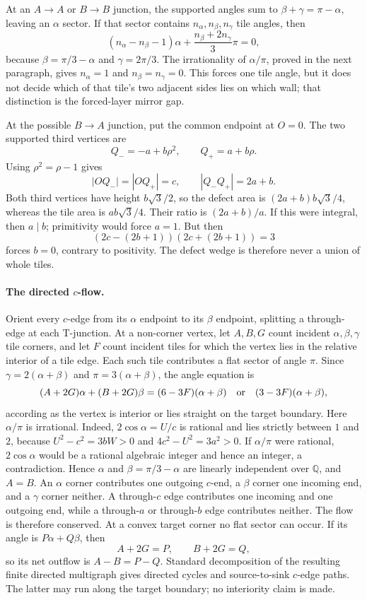\documentclass[11pt]{amsart}
\theoremstyle{definition}
\theoremstyle{remark}
\newcommand{\Q}{\mathbb Q}
\begin{document}
At an $A\to A$ or $B\to B$ junction, the supported angles sum to
$\beta+\gamma=\pi-\alpha$, leaving an $\alpha$ sector.  If that sector
contains $n_\alpha,n_\beta,n_\gamma$ tile angles, then
\[
 (n_\alpha-n_\beta-1)\alpha+
 \frac{n_\beta+2n_\gamma}{3}\pi=0,
\]
because $\beta=\pi/3-\alpha$ and $\gamma=2\pi/3$.  The irrationality of
$\alpha/\pi$, proved in the next paragraph, gives
$n_\alpha=1$ and $n_\beta=n_\gamma=0$.  This forces one tile angle, but it
does not decide which of that tile's two adjacent sides lies on which
wall; that distinction is the forced-layer mirror gap.

At the possible $B\to A$ junction, put the common endpoint at $O=0$.
The two supported third vertices are
\[
                  Q_-=-a+b\rho^2,\qquad Q_+=a+b\rho.
\]
Using $\rho^2=\rho-1$ gives
\[
 |OQ_-|=|OQ_+|=c,\qquad |Q_-Q_+|=2a+b.
\]
Both third vertices have height $b\sqrt3/2$, so the defect area is
$(2a+b)b\sqrt3/4$, whereas the tile area is $ab\sqrt3/4$.
Their ratio is $(2a+b)/a$.  If this were integral, then $a\mid b$;
primitivity would force $a=1$.  But then
\[
             (2c-(2b+1))(2c+(2b+1))=3
\]
forces $b=0$, contrary to positivity.  The defect wedge is therefore never
a union of whole tiles.

\paragraph{The directed $c$-flow.}
Orient every $c$-edge from its $\alpha$ endpoint to its $\beta$ endpoint,
splitting a through-edge at each T-junction.  At a non-corner vertex, let
$A,B,G$ count incident $\alpha,\beta,\gamma$ tile corners, and let $F$
count incident tiles for which the vertex lies in the relative interior of
a tile edge.  Each such tile contributes a flat sector of angle $\pi$.
Since $\gamma=2(\alpha+\beta)$ and $\pi=3(\alpha+\beta)$, the angle
equation is
\[
 (A+2G)\alpha+(B+2G)\beta
 =(6-3F)(\alpha+\beta)\quad\hbox{or}\quad
   (3-3F)(\alpha+\beta),
\]
according as the vertex is interior or lies straight on the target boundary.
Here $\alpha/\pi$ is irrational.  Indeed,
$2\cos\alpha=U/c$ is rational and lies strictly between $1$ and $2$, because
$U^2-c^2=3bW>0$ and $4c^2-U^2=3a^2>0$.  If $\alpha/\pi$ were rational,
$2\cos\alpha$ would be a rational algebraic integer and hence an integer, a
contradiction.  Hence
$\alpha$ and $\beta=\pi/3-\alpha$ are linearly independent over $\Q$, and
$A=B$.
An $\alpha$ corner contributes one outgoing $c$-end, a $\beta$ corner one
incoming end, and a $\gamma$ corner neither.  A through-$c$ edge contributes
one incoming and one outgoing end, while a through-$a$ or through-$b$ edge
contributes neither.  The flow is therefore conserved.
At a convex target corner no flat sector can occur.  If its angle is
$P\alpha+Q\beta$, then
\[
       A+2G=P,\qquad B+2G=Q,
\]
so its net outflow is $A-B=P-Q$.  Standard decomposition of the resulting
finite directed multigraph gives directed cycles and source-to-sink
$c$-edge paths.  The latter may run along the target boundary; no interiority
claim is made.
\end{document}
